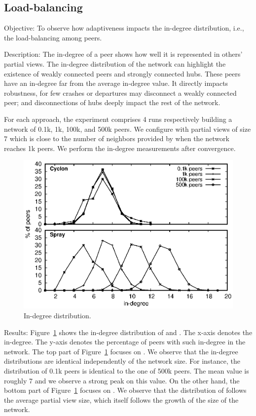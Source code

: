 \subsection{Load-balancing}

\begin{asparadesc}
\item[Objective:] To observe how adaptiveness impacts the in-degree
  distribution, i.e., the load-balancing among peers.
\item[Description:] The in-degree of a peer shows how well it is represented in
  others' partial views. The in-degree distribution of the network can highlight
  the existence of weakly connected peers and strongly connected hubs. These
  peers have an in-degree far from the average in-degree value. It directly
  impacts robustness, for few crashes or departures may disconnect a weakly
  connected peer; and disconnections of hubs deeply impact the rest of the
  network.

  For each approach, the experiment comprises 4 runs respectively building a
  network of 0.1k, 1k, 100k, and 500k peers. We configure \CYCLON with partial
  views of size $7$ which is close to the number of neighbors provided by \SPRAY
  when the network reaches 1k peers.  We perform the in-degree measurements
  after convergence.

\begin{figure}
  \centering
  \includegraphics[width=\SCALE\textwidth]{img/histo.eps}
  \caption{\label{fig:histo}In-degree distribution.}
\end{figure}

\item[Results:] Figure~\ref{fig:histo} shows the in-degree distribution of
  \CYCLON and \SPRAY. The x-axis denotes the in-degree. The y-axis denotes the
  percentage of peers with such in-degree in the network. The top part of
  Figure~\ref{fig:histo} focuses on \CYCLON. We observe that the in-degree
  distributions are identical independently of the network size. For instance,
  the distribution of 0.1k peers is identical to the one of 500k peers. The mean
  value is roughly 7 and we observe a strong peak on this value. On the other
  hand, the bottom part of Figure~\ref{fig:histo} focuses on \SPRAY. We observe
  that the distribution of \SPRAY follows the average partial view size, which
  itself follows the growth of the size of the network.


\end{asparadesc}
